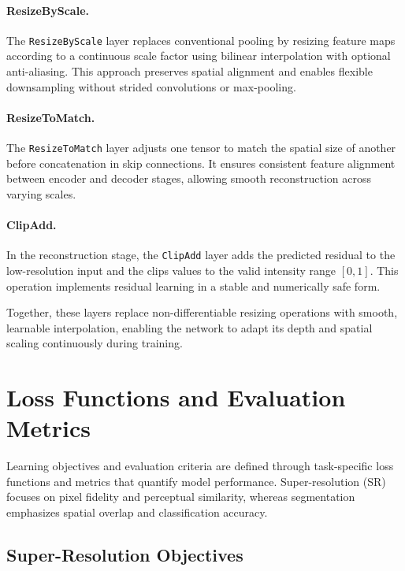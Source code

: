 \paragraph{ResizeByScale.}
The \texttt{ResizeByScale} layer replaces conventional pooling by resizing feature maps according to a continuous scale factor using bilinear interpolation with optional anti-aliasing. 
This approach preserves spatial alignment and enables flexible downsampling without strided convolutions or max-pooling.

\paragraph{ResizeToMatch.}
The \texttt{ResizeToMatch} layer adjusts one tensor to match the spatial size of another before concatenation in skip connections. 
It ensures consistent feature alignment between encoder and decoder stages, allowing smooth reconstruction across varying scales.

\paragraph{ClipAdd.}
In the reconstruction stage, the \texttt{ClipAdd} layer adds the predicted residual to the low-resolution input and the clips values to the valid intensity range \([0,1]\). 
This operation implements residual learning in a stable and numerically safe form.

Together, these layers replace non-differentiable resizing operations with smooth, learnable interpolation, 
enabling the network to adapt its depth and spatial scaling continuously during training.


\section{Loss Functions and Evaluation Metrics}
\label{sec:prelim_loss_metrics}

Learning objectives and evaluation criteria are defined through task-specific loss functions and metrics that quantify model performance.  
Super-resolution (SR) focuses on pixel fidelity and perceptual similarity, whereas segmentation emphasizes spatial overlap and classification accuracy.

\subsection{Super-Resolution Objectives}


